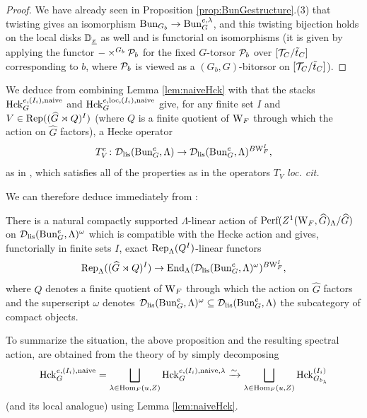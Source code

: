 \begin{proof}
    We have already seen in Proposition \ref{prop:BunGestructure}.(3) that twisting gives an isomorphism $\mathrm{Bun}_{G_{b}} \to \mathrm{Bun}_{G}^{e,\lambda}$, and this twisting bijection holds on the local disks $\mathbb D_{\underline{x}}$ as well and is functorial on isomorphisms (it is given by applying the functor $- \times^{G_{b}} \mathcal{P}_{b}$ for the fixed $G$-torsor $\mathcal{P}_{b}$ over $[\mathcal{T}_{C}/\tilde{t}_{C}]$ corresponding to $b$, where $\mathcal{P}_{b}$ is viewed as a $(G_{b},G)$-bitorsor on $[\mathcal{T}_{C}/\tilde{t}_{C}]$).
\end{proof}

We deduce from combining Lemma \ref{lem:naiveHck} with \cite[Section IX]{Geometrization} that the stacks $\mathrm{Hck}_{G}^{e,(I_{i}),\textnormal{naive}}$ and $\mathrm{Hck}_{G}^{e,\mathrm{loc},(I_{i}),\textnormal{naive}}$ give, for any finite set $I$ and $V \in \textnormal{Rep}((\widehat{G} \rtimes Q)^{I})$ (where $Q$ is a finite quotient of $\mathrm{W}_{F}$ through which the action on $\widehat{G}$ factors), a Hecke operator
\begin{equation*}
    T^{e}_{V} \colon \mathcal{D}_{\textnormal{lis}}(\mathrm{Bun}_{G}^{e},\Lambda) \to \mathcal{D}_{\textnormal{lis}}(\mathrm{Bun}_{G}^{e},\Lambda)^{B\mathrm{W}_{F}^{I}},
\end{equation*}
as in \cite[Theorem IX.0.1]{Geometrization}, which satisfies all of the properties as in the operators $T_{V}$ \emph{loc. cit.} 

We can therefore deduce immediately from \cite[Corollary X.1.3]{Geometrization}:

\begin{prop}\label{prop:naiveSA}
    There is a natural compactly supported $\Lambda$-linear action of $\textnormal{Perf}(Z^{1}(\mathrm{W}_{F},\widehat{G})_{\Lambda}/\widehat{G})$ on $\mathcal{D}_{\textnormal{lis}}(\mathrm{Bun}_{G}^{e},\Lambda)^{\omega}$ which is compatible with the Hecke action and gives, functorially in finite sets $I$, exact $\textnormal{Rep}_{\Lambda}(Q^{I})$-linear functors
    \begin{equation*}
        \textnormal{Rep}_{\Lambda}((\widehat{G} \rtimes Q)^{I}) \to \mathrm{End}_{\Lambda}(\mathcal{D}_{\textnormal{lis}}(\mathrm{Bun}_{G}^{e},\Lambda)^{\omega})^{B\mathrm{W}_{F}^{I}},
    \end{equation*}
    where $Q$ denotes a finite quotient of $\mathrm{W}_{F}$ through which the action on $\widehat{G}$ factors and the superscript $\omega$ denotes $\mathcal{D}_{\textnormal{lis}}(\mathrm{Bun}_{G}^{e},\Lambda)^{\omega} \subseteq \mathcal{D}_{\textnormal{lis}}(\mathrm{Bun}_{G}^{e},\Lambda)$ the subcategory of compact objects.
\end{prop}

To summarize the situation, the above proposition and the resulting spectral action, are obtained from the theory of \cite{Geometrization} by simply decomposing
\begin{equation}\label{eq:naivedecomp}
 \mathrm{Hck}_{G}^{e,(I_{i}),\textnormal{naive}} = \bigsqcup_{\lambda \in \mathrm{Hom}_{F}(u,Z)}  \mathrm{Hck}_{G}^{e,(I_{i}),\textnormal{naive},\lambda} \xrightarrow{\sim}  \bigsqcup_{\lambda \in \mathrm{Hom}_{F}(u,Z)}  \mathrm{Hck}_{G_{b_{\lambda}}}^{(I_{i})}
\end{equation}
(and its local analogue) using Lemma \ref{lem:naiveHck}.

